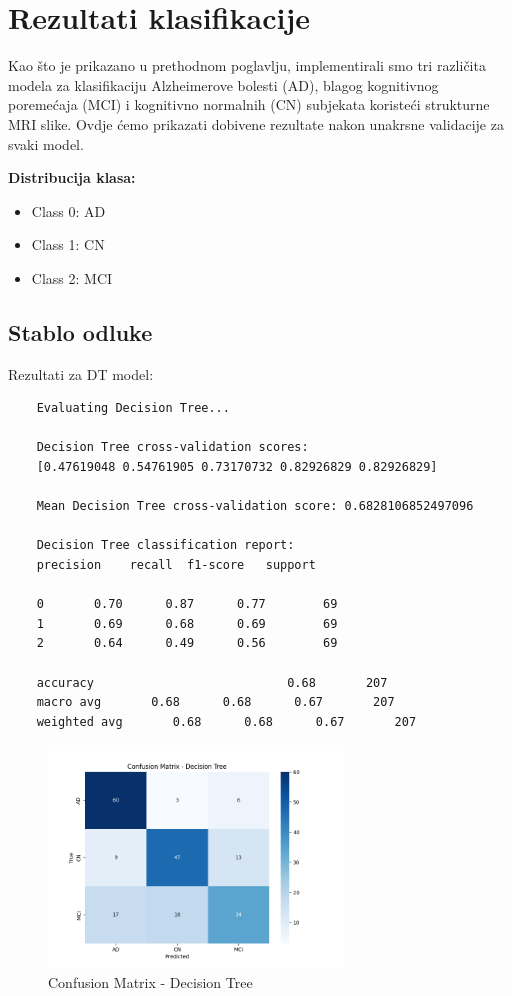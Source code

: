 \documentclass[zavrsnirad,upload]{fer}
\begin{document}
\section{Rezultati klasifikacije}

Kao što je prikazano u prethodnom poglavlju, implementirali smo tri različita modela za klasifikaciju Alzheimerove bolesti (AD), blagog kognitivnog poremećaja (MCI) i kognitivno normalnih (CN) subjekata koristeći strukturne MRI slike. Ovdje ćemo prikazati dobivene rezultate nakon unakrsne validacije za svaki model.

\noindent \textbf{Distribucija klasa:}
\begin{itemize}
	\item Class 0: AD
	\item Class 1: CN
	\item Class 2: MCI
\end{itemize}


\subsection{Stablo odluke}

Rezultati za DT model:

\begin{verbatim}
	Evaluating Decision Tree...
	
	Decision Tree cross-validation scores: 
	[0.47619048 0.54761905 0.73170732 0.82926829 0.82926829]
	
	Mean Decision Tree cross-validation score: 0.6828106852497096
	
	Decision Tree classification report:
	precision    recall  f1-score   support
	
	0       0.70      0.87      0.77        69
	1       0.69      0.68      0.69        69
	2       0.64      0.49      0.56        69
	
	accuracy                           0.68       207
	macro avg       0.68      0.68      0.67       207
	weighted avg       0.68      0.68      0.67       207
\end{verbatim}

\begin{figure}[h]
	\centering
	\includegraphics[width=0.7\textwidth]{Figures/matrix_dt.png}
	\caption{Confusion Matrix - Decision Tree}
	\label{fig:matrix_dt}
\end{figure}
\end{document}
